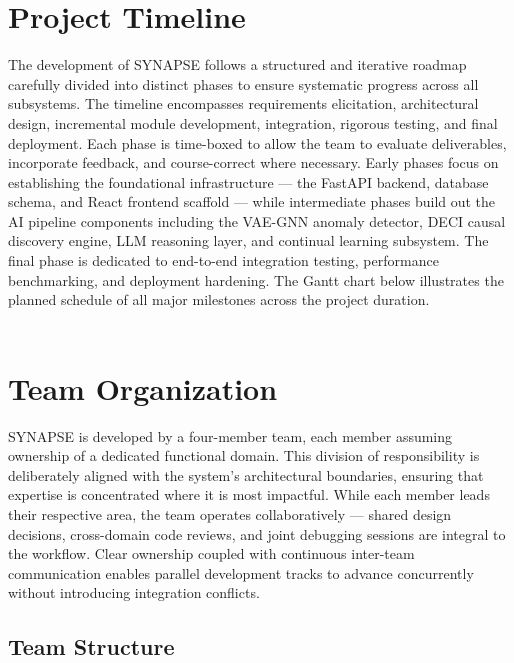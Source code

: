 
\section{Project Timeline}

\hspace*{0.3in} The development of SYNAPSE follows a structured and iterative roadmap carefully divided into distinct phases to ensure systematic progress across all subsystems. The timeline encompasses requirements elicitation, architectural design, incremental module development, integration, rigorous testing, and final deployment. Each phase is time-boxed to allow the team to evaluate deliverables, incorporate feedback, and course-correct where necessary. Early phases focus on establishing the foundational infrastructure — the FastAPI backend, database schema, and React frontend scaffold — while intermediate phases build out the AI pipeline components including the VAE-GNN anomaly detector, DECI causal discovery engine, LLM reasoning layer, and continual learning subsystem. The final phase is dedicated to end-to-end integration testing, performance benchmarking, and deployment hardening. The Gantt chart below illustrates the planned schedule of all major milestones across the project duration.\\\\

\createGanttChart

\section{Team Organization}

\hspace*{0.3in} SYNAPSE is developed by a four-member team, each member assuming ownership of a dedicated functional domain. This division of responsibility is deliberately aligned with the system's architectural boundaries, ensuring that expertise is concentrated where it is most impactful. While each member leads their respective area, the team operates collaboratively — shared design decisions, cross-domain code reviews, and joint debugging sessions are integral to the workflow. Clear ownership coupled with continuous inter-team communication enables parallel development tracks to advance concurrently without introducing integration conflicts.

\subsection{Team Structure}

